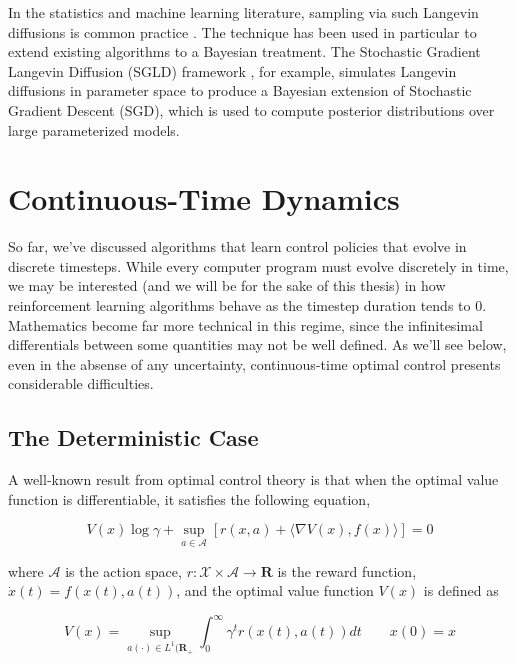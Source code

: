 In the statistics and machine learning literature, sampling via such
Langevin diffusions is common practice
\citep{roberts2002langevin}. The technique has been used in particular
to extend existing algorithms to a Bayesian treatment. The Stochastic
Gradient Langevin Diffusion (SGLD) framework
\citep{welling2011bayesian}, for example, simulates Langevin
diffusions in parameter space to produce a Bayesian extension of
Stochastic Gradient Descent (SGD), which is used to compute posterior
distributions over large parameterized models.

\section{Continuous-Time Dynamics}
So far, we've discussed algorithms that learn control policies that
evolve in discrete timesteps. While every computer program must evolve
discretely in time, we may be interested (and we will be for the sake
of this thesis) in how reinforcement learning algorithms behave as the
timestep duration tends to $0$. Mathematics become far more technical
in this regime, since the infinitesimal differentials between some
quantities may not be well defined. As we'll see below, even in the
absense of any uncertainty, continuous-time optimal control presents
considerable difficulties.

\subsection{The Deterministic Case}
A well-known result from optimal control theory is that when the
optimal value function is differentiable, it satisfies the following
equation,

\begin{equation}
  \label{eq:dynamic-programming}
  V(x)\log\gamma + \sup_{a\in\mathcal{A}}\left[r(x, a) + \langle\nabla
    V(x), f(x)\rangle\right] = 0
\end{equation}

where $\mathcal{A}$ is the action space,
$r:\mathcal{X}\times\mathcal{A}\to\mathbf{R}$ is the reward function,
$\dot{x}(t) = f(x(t), a(t))$,
and the optimal value function $V(x)$ is defined as

\begin{equation}
  \label{eq:value-function-continuous}
  V(x) = \sup_{a(\cdot)\in
    L^1(\mathbf{R}_+}\int_0^\infty\gamma^tr(x(t), a(t))dt\qquad x(0) = x
\end{equation}

